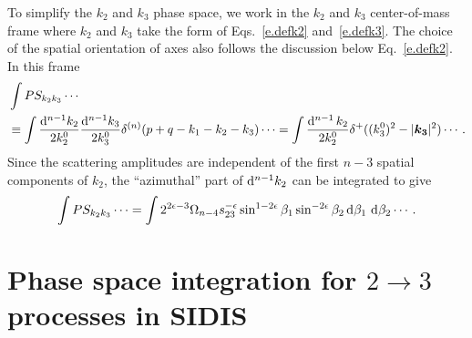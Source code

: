 \documentclass[prd,preprintnumbers,nofootinbib,superscriptaddress,onecolumn,preprint]{revtex4-1}
\newcommand\3[1]{\boldsymbol{#1}}
\newcommand{\no}{\nonumber \\}
\begin{document}
To simplify the $k_2$ and $k_3$ phase space, we work in the $k_2$ and
$k_3$ center-of-mass frame where $k_2$ and $k_3$ take the form of
Eqs.~\eqref{e.defk2} and~\eqref{e.defk3}. The choice of the spatial orientation of axes
also follows the discussion below Eq.~\eqref{e.defk2}. In this frame
\begin{align}
&{} \int PS_{k_2k_3} \cdots \no 
&{}\equiv\int\frac{\diff{^{n-1}k_2}}{2k_2^0}\frac{\diff{^{n-1}k_3}}{2k_3^0}\delta^{(n)}(p+q-k_1-k_2-k_3) \cdots =
\int\frac{\diff{^{n-1}} k_2}{2k_2^0} \delta^+((k_3^0)^2-\lvert
\bm{k_3}\rvert^2) \cdots \, . 
\end{align}
Since the scattering amplitudes are independent of 
the first $n-3$ spatial components of $k_2$, the ``azimuthal'' part of
$\diff{^{n-1}k_2}$ can be integrated to give
\begin{align}
\int PS_{k_2k_3} \cdots =\int
2^{2\epsilon-3} \Omega_{n-4}s_{23}^{-\epsilon}\sin^{1-2\epsilon}\beta_1\sin^{-2\epsilon}\beta_2 \diff{\beta_1}{} \diff{\beta_2} \cdots \, .
\label{eq:ps23}
\end{align}


\section{Phase space integration for $2 \to 3$ processes in SIDIS}
\label{s.integral}
\end{document}
